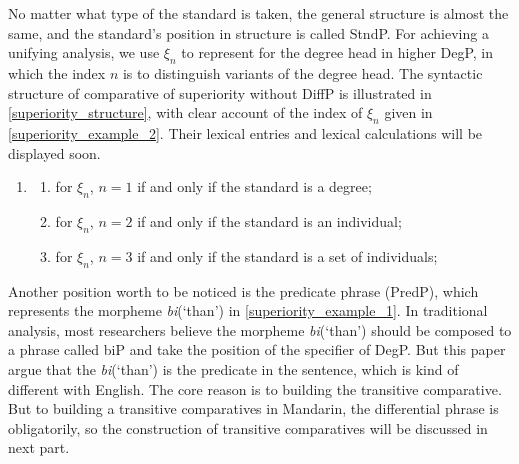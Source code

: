 \documentclass{ctexart}
\begin{document}
No matter what type of the standard is taken, the general structure is almost the same, and the standard's position in structure is called StndP. For achieving a unifying analysis, we use $\xi_n$ to represent for the degree head in higher DegP, in which the index $n$ is to distinguish variants of the degree head. The syntactic structure of comparative of superiority without DiffP is illustrated in \ref{superiority_structure}, with clear account of the index of $\xi_n$ given in \ref{superiority_example_2}. Their lexical entries and lexical calculations will be displayed soon.

\begin{enumerate}
    \item \label{superiority_example_2}
    \begin{enumerate}
        \item \label{superiority_example_2_a}
        for $\xi_n$, $n=1$ if and only if the standard is a degree;

        \item \label{superiority_example_2_b}
        for $\xi_n$, $n=2$ if and only if the standard is an individual;

        \item \label{superiority_example_2_c}
        for $\xi_n$, $n=3$ if and only if the standard is a set of individuals;

    \end{enumerate}
\end{enumerate}

Another position worth to be noticed is the predicate phrase (PredP), which represents the morpheme \textit{bi}(`than') in \ref{superiority_example_1}. In traditional analysis, most researchers believe the morpheme \textit{bi}(`than') should be composed to a phrase called biP and take the position of the specifier of DegP. But this paper argue that the \textit{bi}(`than') is the predicate in the sentence, which is kind of different with English. The core reason is to building the transitive comparative. But to building a transitive comparatives in Mandarin, the differential phrase is obligatorily, so the construction of transitive comparatives will be discussed in next part.
\end{document}
